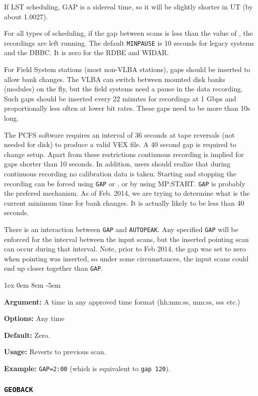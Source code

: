 \documentclass{report}
\newcommand{\rcwbox}[5]{
  \begin{list}{}{\parsep 1ex  \itemsep 0em
                 \leftmargin 8em  \itemindent -5em }
    \item {\bf Argument:} #1
    \item {\bf Options:}  #2
    \item {\bf Default:}  #3
    \item {\bf Usage:}    #4
    \item {\bf Example:}  #5
  \end{list}
}
\begin{document}
If LST scheduling, GAP is a sidereal time, so it will be slightly
shorter in UT (by about 1.0027).

For all types of scheduling, if the gap between scans is less than the
value of , the recordings are
left running.  The default {\tt MINPAUSE} is 10 seconds for legacy
systems and the DBBC. It is zero for the RDBE and WIDAR.

For Field System stations (most non-VLBA stations), gaps should be inserted to
allow bank changes.  The VLBA can switch between mounted disk banks
(modules) on the fly, but the field systems need a pause in the data
recording.  Such gaps should be inserted every 22 minutes for
recordings at 1 Gbps and proportionally less often at lower bit rates.
These gaps need to be more than 10s long.

The PCFS software requires an interval of 36 seconds at tape reversals
(not needed for disk) to produce a valid VEX file. A 40 second gap is
required to change setup.  Apart from these restrictions continuous
recording is implied for gaps shorter than 10 seconds.  In addition,
users should realize that during continuous recording no calibration
data is taken. Starting and stopping the recording can be forced using
{\tt GAP} or , or by using
 {MP:START}.  {\tt GAP} is probably the
prefered mechanism.  As of Feb. 2014, we are trying to determine what
is the current minimum time for bank changes.  It is actually likely
to be less than 40 seconds.

There is an interaction between {\tt GAP} and {\tt AUTOPEAK}.  Any 
specified {\tt GAP} will be enforced for the interval between the 
input scans, but the inserted pointing scan can occur during that 
interval.  Note, prior to Feb 2014, the gap was set to zero when
pointing was inserted, so under some circumstances, the input scans
could end up closer together than {\tt GAP}.


\rcwbox
{A time in any approved time format (hh:mm:ss, mm:ss, sss etc.)}
{Any time}
{Zero.}
{Reverts to previous scan.}
{{\tt GAP=2:00} (which is equivalent to {\tt gap 120}).}


\subsubsection{\label{MP:GEOBACK}{\tt GEOBACK}}
\end{document}
